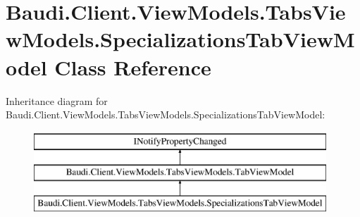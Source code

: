 \hypertarget{class_baudi_1_1_client_1_1_view_models_1_1_tabs_view_models_1_1_specializations_tab_view_model}{}\section{Baudi.\+Client.\+View\+Models.\+Tabs\+View\+Models.\+Specializations\+Tab\+View\+Model Class Reference}
\label{class_baudi_1_1_client_1_1_view_models_1_1_tabs_view_models_1_1_specializations_tab_view_model}
Inheritance diagram for Baudi.\+Client.\+View\+Models.\+Tabs\+View\+Models.\+Specializations\+Tab\+View\+Model\+:\begin{figure}[H]
\begin{center}
\leavevmode
\includegraphics[height=3.000000cm]{class_baudi_1_1_client_1_1_view_models_1_1_tabs_view_models_1_1_specializations_tab_view_model}
\end{center}
\end{figure}
